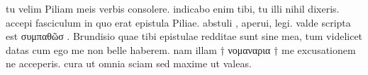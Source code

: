  tu velim Piliam meis verbis consolere. indicabo enim tibi, tu illi nihil dixeris. accepi fasciculum in quo erat epistula Piliae. abstuli , aperui, legi. valde scripta est συμπαθῶσ . Brundisio quae tibi epistulae redditae sunt sine mea, tum videlicet datas cum ego me non belle haberem. nam illam † νομαναρια † me excusationem ne acceperis. cura ut omnia sciam sed maxime ut valeas.
